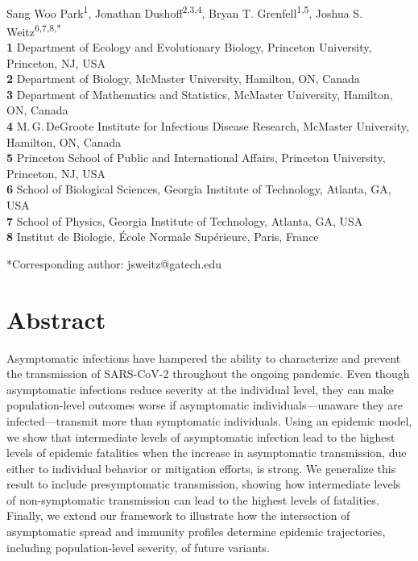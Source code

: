 \documentclass[12pt]{article}
\date{\today}
\begin{document}
\begin{flushleft}{
	\Large
	\textbf{}
}
\newline
\\
Sang Woo Park\textsuperscript{1},
Jonathan Dushoff\textsuperscript{2,3,4},
Bryan T. Grenfell\textsuperscript{1,5},
Joshua S. Weitz\textsuperscript{6,7,8,*}
\\
\bigskip
\textbf{1} Department of Ecology and Evolutionary Biology, Princeton University, Princeton, NJ, USA
\\
\textbf{2} Department of Biology, McMaster University, Hamilton, ON, Canada
\\
\textbf{3} Department of Mathematics and Statistics, McMaster University, Hamilton, ON, Canada
\\
\textbf{4} M.\,G.\,DeGroote Institute for Infectious Disease Research, McMaster University, Hamilton, ON, Canada
\\
\textbf{5} Princeton School of Public and International Affairs, Princeton University, Princeton, NJ, USA
\\
\textbf{6} School of Biological Sciences, Georgia Institute of Technology, Atlanta, GA, USA
\\
\textbf{7} School of Physics, Georgia Institute of Technology, Atlanta, GA, USA
\\
\textbf{8} Institut de Biologie, \'{E}cole Normale Sup\'{e}rieure, Paris, France
\\
\bigskip

*Corresponding author: jsweitz@gatech.edu
\bigskip
\end{flushleft}

\section*{Abstract}

Asymptomatic infections have hampered the ability to characterize and prevent the transmission of SARS-CoV-2 throughout the ongoing pandemic.
Even though asymptomatic infections reduce severity at the individual level, they can make population-level outcomes worse if asymptomatic individuals---unaware they are infected---transmit more than symptomatic individuals.
Using an epidemic model, we show that intermediate levels of asymptomatic infection lead to the highest levels of epidemic fatalities when the increase in asymptomatic transmission, due either to individual behavior or mitigation efforts, is strong. 
We generalize this result to include presymptomatic transmission, showing how intermediate levels of non-symptomatic transmission can lead to the highest levels of fatalities.
Finally, we extend our framework to illustrate how the intersection of asymptomatic spread and immunity profiles determine epidemic trajectories, including population-level severity, of future variants. 
\end{document}
